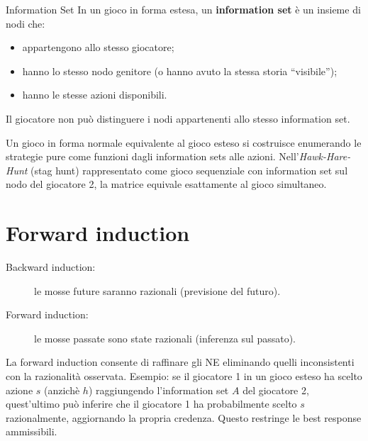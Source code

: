 \documentclass[12pt,a4paper,twoside]{book}
\theoremstyle{plain}
\theoremstyle{definition}
\begin{document}
\begin{defbox}{Information Set}
In un gioco in forma estesa, un \textbf{information set} è un insieme di nodi che:
\begin{itemize}
  \item appartengono allo stesso giocatore;
  \item hanno lo stesso nodo genitore (o hanno avuto la stessa storia ``visibile'');
  \item hanno le stesse azioni disponibili.
\end{itemize}
Il giocatore non può distinguere i nodi appartenenti allo stesso information set.
\end{defbox}

Un gioco in forma normale equivalente al gioco esteso si costruisce enumerando le strategie pure come funzioni dagli information sets alle azioni. Nell'\emph{Hawk-Hare-Hunt} (stag hunt) rappresentato come gioco sequenziale con information set sul nodo del giocatore 2, la matrice equivale esattamente al gioco simultaneo.

\section{Forward induction}

\begin{description}
  \item[Backward induction:] le mosse future saranno razionali (previsione del futuro).
  \item[Forward induction:] le mosse passate sono state razionali (inferenza sul passato).
\end{description}

La forward induction consente di raffinare gli NE eliminando quelli inconsistenti con la razionalità osservata. Esempio: se il giocatore 1 in un gioco esteso ha scelto azione $s$ (anzichè $h$) raggiungendo l'information set $A$ del giocatore 2, quest'ultimo può inferire che il giocatore 1 ha probabilmente scelto $s$ razionalmente, aggiornando la propria credenza. Questo restringe le best response ammissibili.
\end{document}
